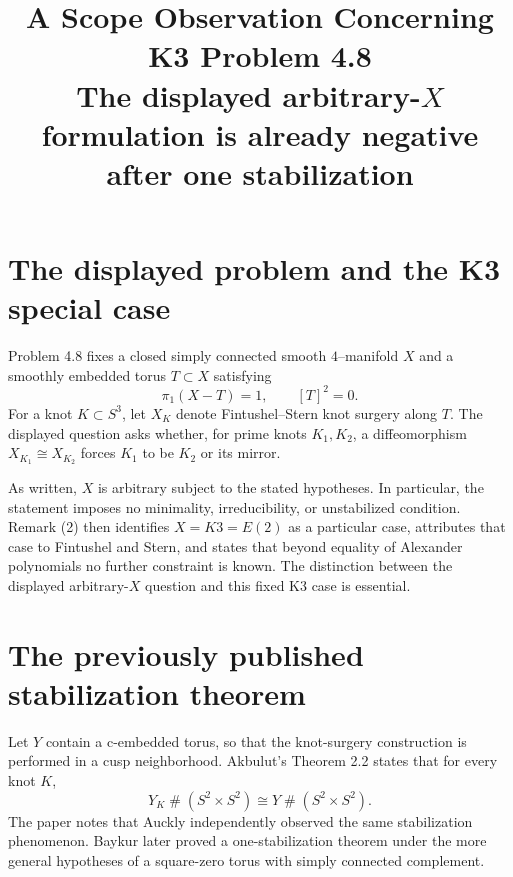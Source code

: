 \documentclass[11pt]{article}
\title{A Scope Observation Concerning K3 Problem 4.8\\[4pt]
\large The displayed arbitrary-$X$ formulation is already negative after one stabilization}
\author{}
\date{}
\theoremstyle{remark}
\begin{document}
\maketitle
\vspace{-1.5em}

\begin{center}
\end{center}

\section{The displayed problem and the K3 special case}

Problem 4.8 fixes a closed simply connected smooth $4$--manifold $X$ and a
smoothly embedded torus $T\subset X$ satisfying
\[
  \pi_1(X-T)=1,
  \qquad [T]^2=0.
\]
For a knot $K\subset S^3$, let $X_K$ denote Fintushel--Stern knot surgery
along $T$.  The displayed question asks whether, for prime knots $K_1,K_2$,
a diffeomorphism $X_{K_1}\cong X_{K_2}$ forces $K_1$ to be $K_2$ or its
mirror.

As written, $X$ is arbitrary subject to the stated hypotheses.  In
particular, the statement imposes no minimality, irreducibility, or
unstabilized condition.  Remark (2) then identifies $X=K3=E(2)$ as a
particular case, attributes that case to Fintushel and Stern, and states that
beyond equality of Alexander polynomials no further constraint is known.
The distinction between the displayed arbitrary-$X$ question and this fixed
K3 case is essential.

\section{The previously published stabilization theorem}

Let $Y$ contain a c-embedded torus, so that the knot-surgery construction is
performed in a cusp neighborhood.  Akbulut's Theorem 2.2 states that for
every knot $K$,
\begin{equation}\label{eq:akbulut}
  Y_K\mathbin{\#}(S^2\times S^2)
  \cong
  Y\mathbin{\#}(S^2\times S^2).
\end{equation}
The paper notes that Auckly independently observed the same stabilization
phenomenon.  Baykur later proved a one-stabilization theorem under the more
general hypotheses of a square-zero torus with simply connected complement.
\end{document}
